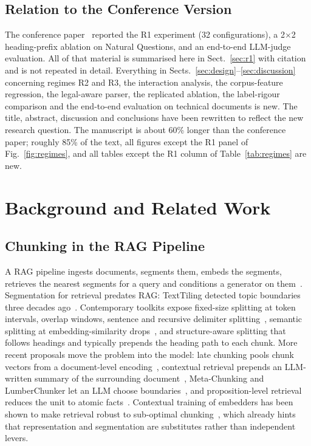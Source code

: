 \documentclass[runningheads]{llncs}
\begin{document}
\subsection{Relation to the Conference Version}
\label{sec:whatsnew}
The conference paper~\cite{chauhan2026chunking} reported the R1 experiment (32 configurations), a 2$\times$2 heading-prefix ablation on Natural Questions, and an end-to-end LLM-judge evaluation. All of that material is summarised here in Sect.~\ref{sec:r1} with citation and is not repeated in detail. Everything in Sects.~\ref{sec:design}--\ref{sec:discussion} concerning regimes R2 and R3, the interaction analysis, the corpus-feature regression, the legal-aware parser, the replicated ablation, the label-rigour comparison and the end-to-end evaluation on technical documents is new. The title, abstract, discussion and conclusions have been rewritten to reflect the new research question. The manuscript is about 60\% longer than the conference paper; roughly 85\% of the text, all figures except the R1 panel of Fig.~\ref{fig:regimes}, and all tables except the R1 column of Table~\ref{tab:regimes} are new.

\section{Background and Related Work}
\label{sec:related}

\subsection{Chunking in the RAG Pipeline}
A RAG pipeline ingests documents, segments them, embeds the segments, retrieves the nearest segments for a query and conditions a generator on them~\cite{lewis2020rag,karpukhin2020dpr}. Segmentation for retrieval predates RAG: TextTiling detected topic boundaries three decades ago~\cite{hearst1997texttiling}. Contemporary toolkits expose fixed-size splitting at token intervals, overlap windows, sentence and recursive delimiter splitting~\cite{langchain2023}, semantic splitting at embedding-similarity drops~\cite{kamradt2023}, and structure-aware splitting that follows headings and typically prepends the heading path to each chunk. More recent proposals move the problem into the model: late chunking pools chunk vectors from a document-level encoding~\cite{gunther2024latechunking}, contextual retrieval prepends an LLM-written summary of the surrounding document~\cite{anthropic2024contextual}, Meta-Chunking and LumberChunker let an LLM choose boundaries~\cite{zhao2024metachunking,duarte2024lumberchunker}, and proposition-level retrieval reduces the unit to atomic facts~\cite{chen2024densex}. Contextual training of embedders has been shown to make retrieval robust to sub-optimal chunking~\cite{conti2025conteb}, which already hints that representation and segmentation are substitutes rather than independent levers.
\end{document}
